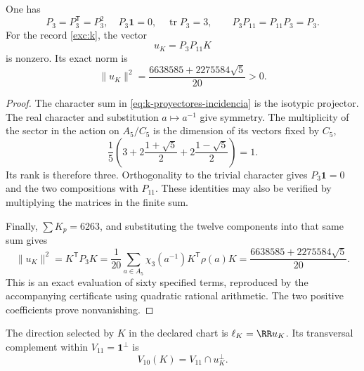 \begin{lemma}
\label{lem:k-sector-no-nulo}
One has
\[
 P_3=P_3^{\mathsf T}=P_3^2,\quad
 P_3\mathbf1=0,\quad \operatorname{tr}P_3=3,
 \qquad P_3P_{11}=P_{11}P_3=P_3.
\]
For the record \eqref{exc:k}, the vector
\begin{equation}
 u_K=P_3P_{11}K
 \label{eq:k-vector-direccional}
\end{equation}
is nonzero. Its exact norm is
\begin{equation}
 \lVert u_K\rVert^2
 =\frac{6638585+2275584\sqrt5}{20}>0.
 \label{eq:k-norma-direccion}
\end{equation}
\end{lemma}
\begin{proof}
The character sum in \eqref{eq:k-proyectores-incidencia} is the
isotypic projector. The real character and substitution \(a\mapsto a^{-1}\)
give symmetry. The multiplicity of the sector in the action on
\(A_5/C_5\) is the dimension of its vectors fixed by \(C_5\),
\[
 \frac15\left(3+2\frac{1+\sqrt5}{2}
                 +2\frac{1-\sqrt5}{2}\right)=1.
\]
Its rank is therefore three. Orthogonality to the trivial character
gives \(P_3\mathbf1=0\) and the two compositions with \(P_{11}\).
These identities may also be verified by multiplying the
matrices in the finite sum.

Finally, \(\sum K_p=6263\), and substituting the twelve
components into that same sum gives
\[
 \lVert u_K\rVert^2=K^{\mathsf T}P_3K
 =\frac1{20}\sum_{a\in A_5}
                \chi_3(a^{-1})K^{\mathsf T}\rho(a)K
 =\frac{6638585+2275584\sqrt5}{20}.
\]
This is an exact evaluation of sixty specified terms,
reproduced by the accompanying certificate using quadratic rational
arithmetic. The two positive coefficients prove nonvanishing.
\end{proof}

\begin{definition}
The direction selected by \(K\) in the declared chart is
\(\ell_K=\RR u_K\). Its transversal complement within
\(V_{11}=\mathbf1^\perp\) is
\[
 V_{10}(K)=V_{11}\cap u_K^\perp.
\]
\end{definition}

